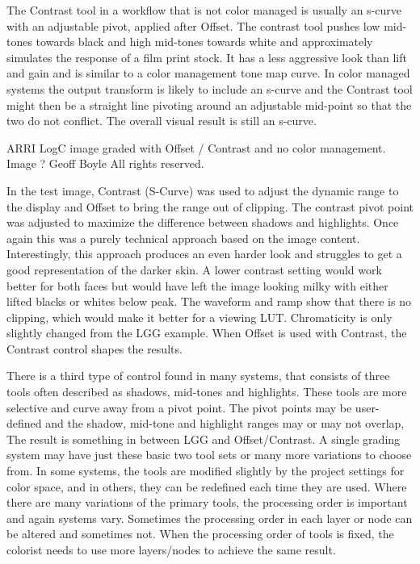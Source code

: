 The Contrast tool in a workflow that is not color managed is usually an s-curve with an adjustable pivot, applied after Offset. The contrast tool pushes low mid-tones towards black and high mid-tones towards white and approximately simulates the response of a film print stock. It has a less aggressive look than lift and gain and is similar to a color management tone map curve. In color managed systems the output transform is likely to include an s-curve and the Contrast tool might then be a straight line pivoting around an adjustable mid-point so that the two do not conflict. The overall visual result is still an s-curve.


ARRI LogC image graded with Offset / Contrast and no color management. Image ? Geoff Boyle All rights reserved.

In the test image, Contrast (S-Curve) was used to adjust the dynamic range to the display and  Offset to bring the range out of clipping. The contrast pivot point was adjusted to maximize the difference between shadows and highlights. Once again this was a purely technical approach based on the image content. Interestingly, this approach produces an even harder look and struggles to get a good representation of the darker skin. A lower contrast setting would work better for both faces but would have left the image looking milky with either lifted blacks or whites below peak. The waveform and ramp show that there is no clipping, which would make it better for a viewing LUT. Chromaticity is only slightly changed from the LGG example. When Offset is used with Contrast, the Contrast control shapes the results.

There is a third type of control found in many systems, that consists of three tools often described as shadows, mid-tones and highlights. These tools are more selective and curve away from a pivot point. The pivot points may be user-defined and the shadow, mid-tone and highlight ranges may or may not overlap, The result is something in between LGG and Offset/Contrast. A single grading system may have just these basic two tool sets or many more variations to choose from. In some systems, the tools are modified slightly by the project settings for color space, and in others, they can be redefined each time they are used. Where there are many variations of the primary tools, the processing order is important and again systems vary. Sometimes the processing order in each layer or node can be altered and sometimes not. When the processing order of tools is fixed, the colorist needs to use more layers/nodes to achieve the same result.


